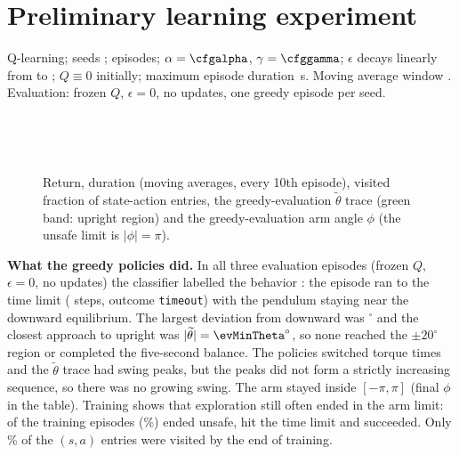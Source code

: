 \documentclass[11pt]{article}
\begin{document}
\section{Preliminary learning experiment}
Q-learning; seeds \expseeds; \nepisodes{} episodes; $\alpha=\cfgalpha$, $\gamma=\cfggamma$; $\epsilon$ decays linearly from \epsstart{} to \epsend{}; $Q\equiv0$ initially; maximum episode duration \maxepsec\,s. Moving average window \mawindow. Evaluation: frozen $Q$, $\epsilon=0$, no updates, one greedy episode per seed.
\begin{center}\small\end{center}
\begin{center}\small\end{center}
\begin{figure}[H]\centering
\begin{minipage}{.48\linewidth}\end{minipage}\hfill
\begin{minipage}{.48\linewidth}\end{minipage}\\[1ex]
\begin{minipage}{.48\linewidth}\end{minipage}\hfill
\begin{minipage}{.48\linewidth}\end{minipage}\\[1ex]
\begin{minipage}{.48\linewidth}\end{minipage}
\caption{Return, duration (moving averages, every 10th episode), visited fraction of state-action entries, the greedy-evaluation $\widetilde\theta$ trace (green band: upright region) and the greedy-evaluation arm angle $\phi$ (the unsafe limit is $|\phi|=\pi$).}
\end{figure}
\textbf{What the greedy policies did.} In all three evaluation episodes (frozen $Q$, $\epsilon=0$, no updates) the classifier labelled the behavior \texttt{\evClass}: the episode ran to the time limit (\evSteps{} steps, outcome \texttt{timeout}) with the pendulum staying near the downward equilibrium. The largest deviation from downward was \evMaxDev$^\circ$ and the closest approach to upright was $|\widetilde\theta|=\evMinTheta^\circ$, so none reached the $\pm20^\circ$ region or completed the five-second balance. The policies switched torque \evSwitches{} times and the $\widetilde\theta$ trace had \evPeaks{} swing peaks, but the peaks did not form a strictly increasing sequence, so there was no growing swing. The arm stayed inside $[-\pi,\pi]$ (final $\phi$ in the table). Training shows that exploration still often ended in the arm limit: \unsafeCount{} of the \totalEps{} training episodes (\unsafePct\%) ended unsafe, \timeoutCount{} hit the time limit and \successCount{} succeeded. Only \visFrac\% of the $(s,a)$ entries were visited by the end of training.
\begin{center}\small\end{center}
\end{document}

